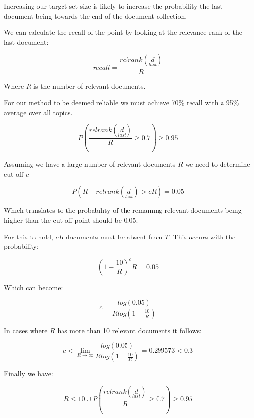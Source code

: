 Increasing our target set size is likely to increase the probability the last document being towards the end of the document collection.

We can calculate the recall of the point by looking at the relevance rank of the last document:

\begin{equation}
	  recall = \frac{relrank(\underset{last}{d})}{R}
\end{equation}

Where $R$ is the number of relevant documents.


For our method to be deemed reliable we must achieve 70\% recall with a 95\% average over all topics.

\begin{equation}
	  P(\frac{relrank(\underset{last}{d})}{R} \geqslant 0.7) \geqslant 0.95
\end{equation}


Assuming we have a large number of relevant documents $R$ we need to determine cut-off $c$

\begin{equation}
	  P(R - relrank(\underset{last}{d}) > cR) = 0.05
\end{equation}

Which translates to the probability of the remaining relevant documents being higher than the cut-off point should be 0.05.

For this to hold, $cR$ documents must be absent from $T$. This occurs with the probability:


\begin{equation}
	  (1 - \frac{10}{R}) ^cR = 0.05
\end{equation}

Which can become:

\begin{equation}
	  c = \frac{log(0.05)}{R log(1 - \frac{10}{R})}
\end{equation}


In cases where $R$ has more than 10 relevant documents it follows:


\begin{equation}
	  c < \lim_{R \to \infty} \frac{log(0.05)}{R log (1 - \frac{10}{R})} = 0.299573 < 0.3
\end{equation}

Finally we have:

\begin{equation}
	 R \leq 10 \cup P(\frac{relrank(\underset{last}{d})}{R} \geq 0.7) 	\geq 0.95
\end{equation}

